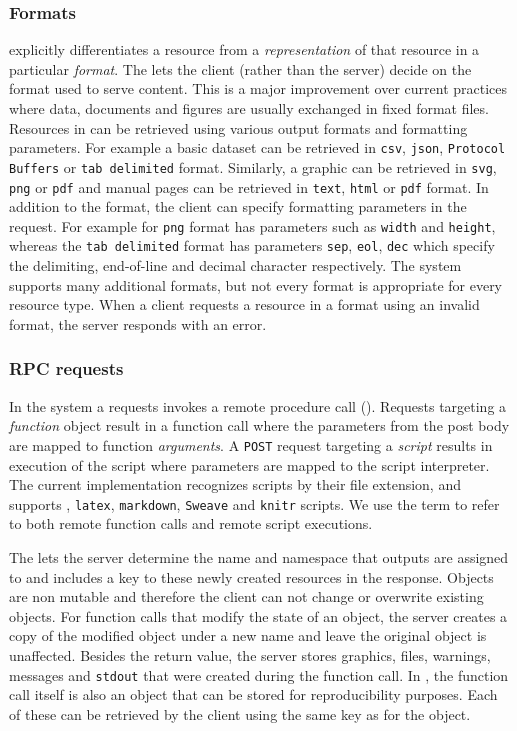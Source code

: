 \subsubsection{Formats}

\OpenCPU explicitly differentiates a resource from a \emph{representation} of that resource in a particular \emph{format}. The \API lets the client (rather than the server) decide on the format used to serve content. This is a major improvement over current practices where data, documents and figures are usually exchanged in fixed format files. Resources in \OpenCPU can be retrieved using various output formats and formatting parameters. For example a basic dataset can be retrieved in \texttt{csv}, \texttt{json}, \texttt{Protocol Buffers} or \texttt{tab delimited} format. Similarly, a graphic can be retrieved in \texttt{svg}, \texttt{png} or \texttt{pdf} and manual pages can be retrieved in \texttt{text}, \texttt{html} or \texttt{pdf} format. In addition to the format, the client can specify formatting parameters in the request. For example for \texttt{png} format has parameters such as \texttt{width} and \texttt{height}, whereas the \texttt{tab delimited} format has parameters \texttt{sep}, \texttt{eol}, \texttt{dec} which specify the delimiting, end-of-line and decimal character respectively. The system supports many additional formats, but not every format is appropriate for every resource type. When a client requests a resource in a format using an invalid format, the server responds with an error. 

\subsubsection{RPC requests}

In the \OpenCPU system a \POST requests invokes a remote procedure call (\RPC). Requests targeting a \emph{function} object result in a function call where the \HTTP parameters from the post body are mapped to function \emph{arguments}. A \texttt{POST} request targeting a \emph{script} results in execution of the script where \HTTP parameters are mapped to the script interpreter. The current \OpenCPU implementation recognizes scripts by their file extension, and supports \R, \texttt{latex}, \texttt{markdown}, \texttt{Sweave} and \texttt{knitr} scripts. We use the term \RPC to refer to both remote function calls and remote script executions.

The \OpenCPU \API lets the server determine the name and namespace that outputs are assigned to and includes a key to these newly created resources in the response. Objects are non mutable and therefore the client can not change or overwrite existing objects. For function calls that modify the state of an object, the server creates a copy of the modified object under a new name and leave the original object is unaffected. Besides the return value, the server stores graphics, files, warnings, messages and \texttt{stdout} that were created during the function call. In \R, the function call itself is also an object that can be stored for reproducibility purposes. Each of these can be retrieved by the client using the same key as for the object.

